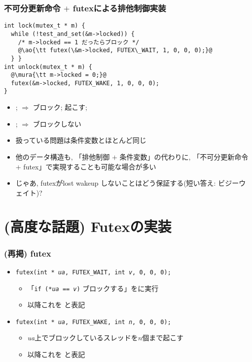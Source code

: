 \documentclass[12pt,dvipdfmx]{beamer}
\begin{document}
\begin{frame}[fragile]
  \frametitle{不可分更新命令 $+$ futexによる排他制御実装}
\begin{lstlisting}
int lock(mutex_t * m) {
  while (!test_and_set(&m->locked)) {
    /* m->locked == 1 だったらブロック */
    @\ao{\tt futex(\&m->locked, FUTEX\_WAIT, 1, 0, 0, 0);}@
  } }
int unlock(mutex_t * m) {
  @\mura{\tt m->locked = 0;}@
  futex(&m->locked, FUTEX_WAKE, 1, 0, 0, 0);
}
\end{lstlisting}

\begin{itemize}
\item {} ;  $\Rightarrow$ ブロック; 起こす;
\item {} ;  $\Rightarrow$ ブロックしない
\end{itemize}

\begin{itemize}
\item 扱っている問題は条件変数とほとんど同じ
\item 他のデータ構造も, 「排他制御 $+$ 条件変数」の代わりに,
  「不可分更新命令 $+$ futex」で実現することも可能な場合が多い
\item じゃあ, futexがlost wakeup しないことはどう保証する(短い答え: ビジーウェイト)? 
\end{itemize}
\end{frame}

\section{(高度な話題) Futexの実装}

\begin{frame}
  \frametitle{(再掲) futex}
  \begin{itemize}
  \item {\tt futex(int * {\it ua}, FUTEX\_WAIT, int {\it v}, 0, 0, 0);}
    \begin{itemize}
    \item 「{\tt if (*{\it ua} == {\it v})} ブロックする」をに実行
    \item 以降これを
       と表記
    \end{itemize}
  \item {\tt futex(int * {\it ua}, FUTEX\_WAKE, int {\it n}, 0, 0, 0);}
    \begin{itemize}
    \item {\it ua}上でブロックしているスレッドを$n$個まで起こす
    \item 以降これを
       と表記
    \end{itemize}
  \end{itemize}
\end{frame}
\end{document}

